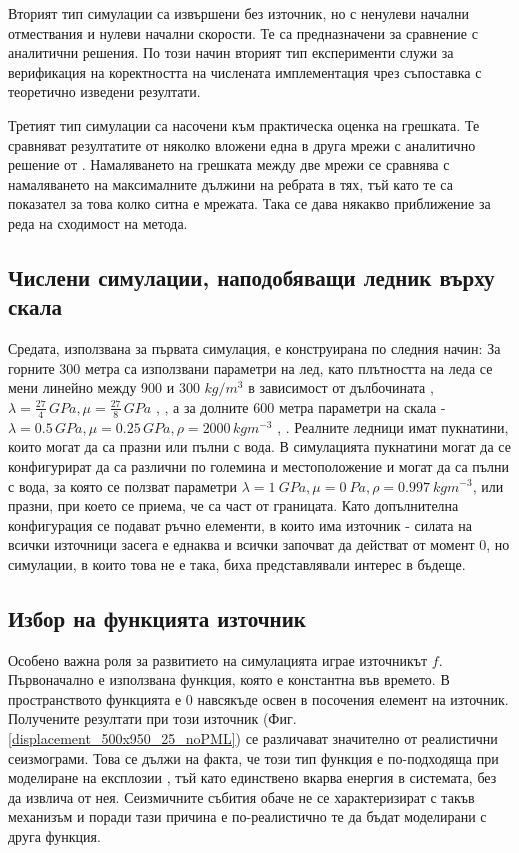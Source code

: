 \documentclass{report}
\begin{document}
	Вторият тип симулации са извършени без източник, но с ненулеви начални отмествания и нулеви начални скорости. Те са предназначени за сравнение с аналитични решения. По този начин вторият тип експерименти служи за верификация на коректността на числената имплементация чрез съпоставка с теоретично изведени резултати.
	
	Третият тип симулации са насочени към практическа оценка на грешката. Те сравняват резултатите от няколко вложени една в друга мрежи с аналитично решение от \cite{walters2020analytic}. 
	Намаляването на грешката между две мрежи се сравнява с намаляването на максималните дължини на ребрата в тях, тъй като те са показател за това колко ситна е мрежата. Така се дава някакво приближение за реда на сходимост на метода.
	
	
	\subsection{Числени симулации, наподобяващи ледник върху скала}
	Средата, използвана за първата симулация, е конструирана по следния начин:
	За горните 300 метра са използвани параметри на лед, като плътността на леда се мени линейно между 900 и 300 $kg/m^3$ в зависимост от 
	дълбочината \cite{ice_quadrature_decrease_with_depth}, $\lambda=\frac{27}{4}\,GPa, \mu=\frac{27}{8}\,GPa$ \cite{ice_physics_1974}, \cite{lamme_params_ice}, а за долните 600 метра параметри на скала - $\lambda=0.5\,GPa, \mu=0.25\,GPa, \rho=2000\,kgm^{-3}$  \cite{lamme_params}, \cite{lin2015rockdensity}. 
	Реалните ледници имат пукнатини, които могат да са празни или пълни с вода.
	В симулацията пукнатини могат да се конфигурират да са различни по големина и местоположение и могат да са пълни с вода, за която се ползват параметри $\lambda=1~GPa, \mu=0~ Pa, \rho=0.997~ kgm^{-3}$, 
	или празни, при което се приема, че са част от границата. Като допълнителна конфигурация се подават ръчно елементи, в които има източник - силата на всички източници 
	засега е еднаква и всички започват да действат от момент $0$, но симулации, в които това не е така, биха представлявали интерес в бъдеще.
	
	\subsection{Избор на функцията източник}\label{source}

	Особено важна роля за развитието на симулацията играе източникът $f$. Първоначално е използвана функция, която е константна във времето. В пространството функцията е $0$ навсякъде 
	освен в посочения елемент на източник. Получените резултати при този източник (Фиг. \ref{displacement_500x950_25_noPML}) се различават значително от реалистични сеизмограми. 
	Това се дължи на факта, че този тип функция е по-подходяща при моделиране на експлозии \cite{aki_richards2002_quantitative}, тъй като единствено вкарва енергия 
	в системата, без да извлича от нея. Сеизмичните събития обаче не се характеризират с такъв механизъм и поради тази причина е по-реалистично те да бъдат моделирани с друга функция.
	
\end{document}
